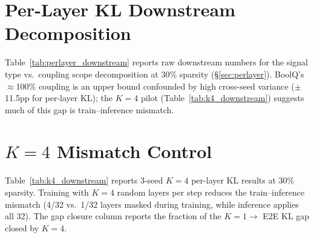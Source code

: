 \section{Per-Layer KL Downstream Decomposition}
\label{app:perlayer_downstream}

Table~\ref{tab:perlayer_downstream} reports raw downstream numbers for the signal type vs.\ coupling scope decomposition at 30\% sparsity (\S\ref{sec:perlayer}). BoolQ's $\approx$100\% coupling is an upper bound confounded by high cross-seed variance ($\pm$11.5pp for per-layer KL); the $K{=}4$ pilot (Table~\ref{tab:k4_downstream}) suggests much of this gap is train--inference mismatch.

\begin{table}[h]
\centering
\caption{2D decomposition at 30\% sparsity (LLaMA-3.1-8B, uniform allocation). All rows are 3-seed mean$\pm$std. Signal type = per-layer KL $-$ MSE; coupling = E2E KL $-$ per-layer KL. Percentages are upper bounds (dimensions not fully orthogonal; see \S\ref{sec:perlayer}).}
\label{tab:perlayer_downstream}
\end{table}

\section{$K{=}4$ Mismatch Control}
\label{app:k4_downstream}

Table~\ref{tab:k4_downstream} reports 3-seed $K{=}4$ per-layer KL results at 30\% sparsity.
Training with $K{=}4$ random layers per step reduces the train--inference mismatch (4/32 vs.\ 1/32 layers masked during training, while inference applies all 32).
The gap closure column reports the fraction of the $K{=}1 \to$ E2E KL gap closed by $K{=}4$.

